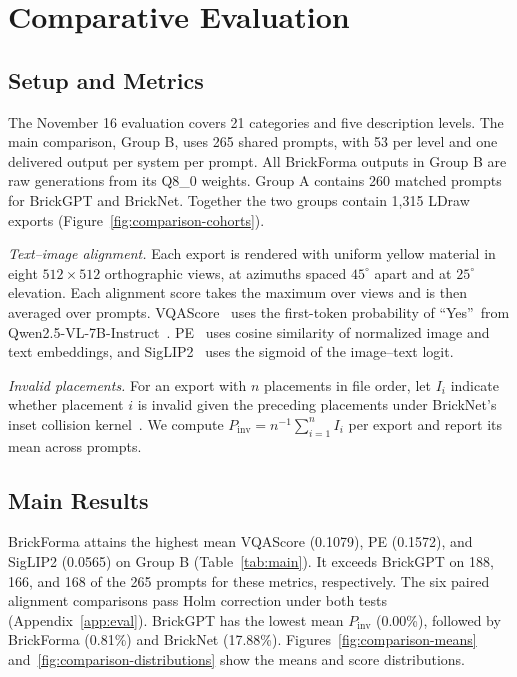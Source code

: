 \section{Comparative Evaluation}
\label{sec:eval}
\subsection{Setup and Metrics}
\label{sec:setup}
The November 16 evaluation covers 21 categories and five description levels. The main comparison, Group B, uses 265 shared prompts, with 53 per level and one delivered output per system per prompt. All BrickForma outputs in Group B are raw generations from its Q8\_0 weights. Group A contains 260 matched prompts for BrickGPT and BrickNet. Together the two groups contain 1,315 LDraw exports (Figure~\ref{fig:comparison-cohorts}).

\emph{Text--image alignment.}
Each export is rendered with uniform yellow material in eight $512{\times}512$ orthographic views, at azimuths spaced $45^\circ$ apart and at $25^\circ$ elevation. Each alignment score takes the maximum over views and is then averaged over prompts. VQAScore~\cite{vqascore} uses the first-token probability of \textquotedblleft Yes\textquotedblright\ from Qwen2.5-VL-7B-Instruct~\cite{qwen25vl}. PE~\cite{pe} uses cosine similarity of normalized image and text embeddings, and SigLIP2~\cite{siglip2} uses the sigmoid of the image--text logit.

\emph{Invalid placements.}
For an export with $n$ placements in file order, let $I_i$ indicate whether placement $i$ is invalid given the preceding placements under BrickNet's inset collision kernel~\cite{bricknet}. We compute $P_{\mathrm{inv}}=n^{-1}\sum_{i=1}^{n}I_i$ per export and report its mean across prompts.

\subsection{Main Results}

BrickForma attains the highest mean VQAScore (0.1079), PE (0.1572), and SigLIP2 (0.0565) on Group B (Table~\ref{tab:main}). It exceeds BrickGPT on 188, 166, and 168 of the 265 prompts for these metrics, respectively. The six paired alignment comparisons pass Holm correction under both tests (Appendix~\ref{app:eval}). BrickGPT has the lowest mean $P_{\mathrm{inv}}$ (0.00\%), followed by BrickForma (0.81\%) and BrickNet (17.88\%). Figures~\ref{fig:comparison-means} and~\ref{fig:comparison-distributions} show the means and score distributions.

